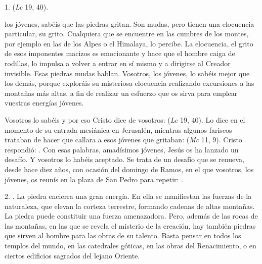 \begin{body}
1.  (\textit{Lc} 19, 40).

 los jóvenes, sabéis que las piedras gritan. Son mudas, pero tienen una elocuencia particular, su grito. Cualquiera que se encuentre en las cumbres de los montes, por ejemplo en las de los Alpes o el Himalaya, lo percibe. La elocuencia, el grito de esos imponentes macizos es emocionante y hace que el hombre caiga de rodillas, lo impulsa a volver a entrar en sí mismo y a dirigirse al Creador invisible. Esas piedras mudas hablan. Vosotros, los jóvenes, lo sabéis mejor que los demás, porque exploráis su misteriosa elocuencia realizando excursiones a las montañas más altas, a fin de realizar un esfuerzo que os sirva para emplear vuestras energías jóvenes.

Vosotros lo sabéis y por eso Cristo dice de vosotros:  (\textit{Lc} 19, 40). Lo dice en el momento de su entrada mesiánica en Jerusalén, mientras algunos fariseos trataban de hacer que callara a esos jóvenes que gritaban:  (\textit{Mc} 11, 9). Cristo respondió: . Con esas palabras, amadísimos jóvenes, Jesús os ha lanzado un desafío. Y vosotros lo habéis aceptado. Se trata de un desafío que se renueva, desde hace diez años, con ocasión del domingo de Ramos, en el que vosotros, los jóvenes, os reunís en la plaza de San Pedro para repetir: .


2. . La piedra encierra una gran energía. En ella se manifiestan las fuerzas de la naturaleza, que elevan la corteza terrestre, formando cadenas de altas montañas. La piedra puede constituir una fuerza amenazadora. Pero, además de las rocas de las montañas, en las que se revela el misterio de la creación, hay también piedras que sirven al hombre para las obras de su talento. Basta pensar en todos los templos del mundo, en las catedrales góticas, en las obras del Renacimiento,  o en ciertos edificios sagrados del lejano Oriente.


\end{body}
